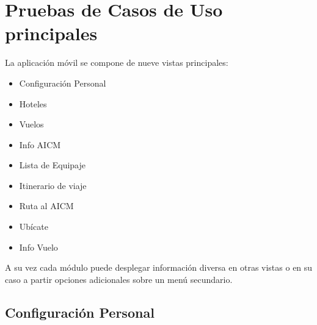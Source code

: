 \section{Pruebas de Casos de Uso principales}
La aplicación móvil se compone de nueve vistas principales:
\begin{itemize}
 \item Configuración Personal
 \item Hoteles
 \item Vuelos
 \item Info AICM
 \item Lista de Equipaje
 \item Itinerario de viaje
 \item Ruta al AICM
 \item Ubícate
 \item Info Vuelo
\end{itemize}

A su vez cada módulo puede desplegar información diversa en otras vistas o en su caso a partir opciones adicionales sobre un menú 
secundario.
\clearpage

\subsection{Configuración Personal}



